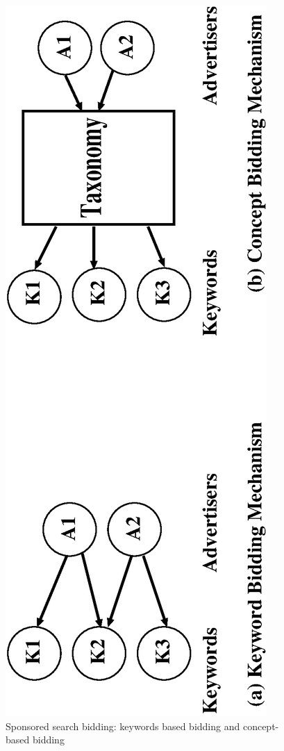 \begin{figure}
  \centering
\includegraphics[scale=0.4,angle = 270]{visuals/bidding_old_new.eps}
  \caption{Sponsored search bidding: keywords based bidding and concept-based bidding}
  \label{bidding_mechanism}
\end{figure}


